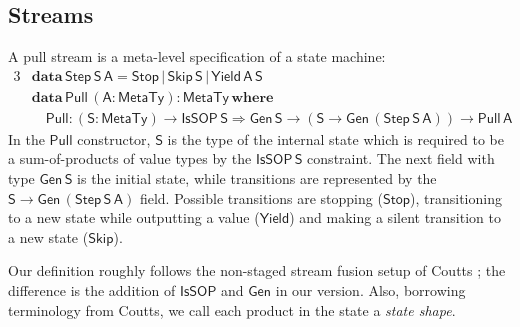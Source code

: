 \documentclass[acmsmall]{acmart}
\newcommand{\msf}[1]{{\mathsf{#1}}}
\newcommand{\mbf}[1]{{\mathbf{#1}}}
\newcommand{\ind}{\hspace{1em}}
\newcommand{\data}{\mbf{data}\,}
\newcommand{\where}{\mbf{where}}
\newcommand{\vA}{\mathsf{A}}
\newcommand{\vS}{\mathsf{S}}
\newcommand{\IsSOP}{\msf{IsSOP}}
\newcommand{\MTy}{\msf{MetaTy}}
\theoremstyle{remark}
\newcommand{\Gen}{\msf{Gen}}
\newcommand{\RA}{\Rightarrow}
\newcommand{\Stop}{\msf{Stop}}
\newcommand{\Skip}{\msf{Skip}}
\newcommand{\Yield}{\msf{Yield}}
\newcommand{\Step}{\msf{Step}}
\newcommand{\Pull}{\msf{Pull}}
\begin{document}
\subsection{Streams}

A pull stream is a meta-level specification of a state machine:
\begin{alignat*}{3}
  & \data \Step\,\vS\,\vA = \Stop\,|\,\Skip\,\vS\,|\,\Yield\,\vA\,\vS\\
  & \data \Pull\,(\vA : \MTy) : \MTy\,\where\\
  & \ind \Pull : (\vS : \MTy) \to \IsSOP\,\vS \RA \Gen\,\vS \to (\vS \to \Gen\,(\Step\,\vS\,\vA)) \to \Pull\,\vA
\end{alignat*}
In the $\Pull$ constructor, $\vS$ is the type of the internal state which is
required to be a sum-of-products of value types by the $\IsSOP\,\vS$
constraint. The next field with type $\Gen\,\vS$ is the initial state, while
transitions are represented by the $\vS \to \Gen\,(\Step\,\vS\,\vA)$
field. Possible transitions are stopping ($\Stop$), transitioning to a new state
while outputting a value ($\Yield$) and making a silent transition to a new
state ($\Skip$).

Our definition roughly follows the non-staged stream fusion setup of
Coutts \cite{DBLP:phd/ethos/Coutts11}; the difference is the addition of
$\IsSOP$ and $\Gen$ in our version. Also, borrowing terminology from Coutts, we
call each product in the state a \emph{state shape}.
\end{document}
